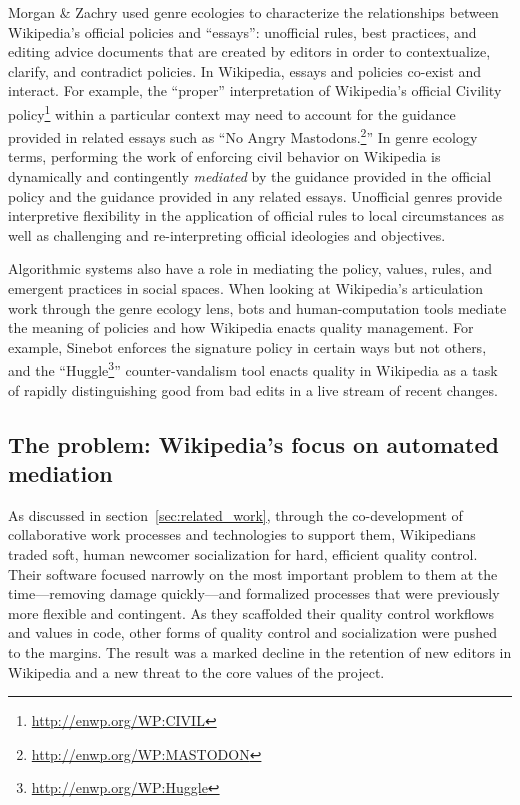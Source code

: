 Morgan \& Zachry used genre ecologies to characterize the relationships between Wikipedia's official policies and ``essays'': unofficial rules, best practices, and editing advice documents that are created by editors in order to contextualize, clarify, and contradict policies\cite{morgan2010negotiating}. In Wikipedia, essays and policies co-exist and interact. For example, the ``proper'' interpretation of Wikipedia's official Civility policy\footnote{\url{http://enwp.org/WP:CIVIL}} within a particular context may need to account for the guidance provided in related essays such as ``No Angry Mastodons.\footnote{\url{http://enwp.org/WP:MASTODON}}'' In genre ecology terms, performing the work of enforcing civil behavior on Wikipedia is dynamically and contingently \emph{mediated} by the guidance provided in the official policy and the guidance provided in any related essays. Unofficial genres provide interpretive flexibility in the application of official rules to local circumstances as well as challenging and re-interpreting official ideologies and objectives.

Algorithmic systems also have a role in mediating the policy, values, rules, and emergent practices in social spaces\cite{lessig1999code,suchman2007human,orlikowski2015algorithm}.  When looking at Wikipedia's articulation work through the genre ecology lens, bots and human-computation tools mediate the meaning of policies and how Wikipedia enacts quality management. For example, Sinebot enforces the signature policy in certain ways but not others\cite{geiger2011lives}, and the ``Huggle\footnote{\url{http://enwp.org/WP:Huggle}}'' counter-vandalism tool enacts quality in Wikipedia as a task of rapidly distinguishing good from bad edits in a live stream of recent changes\cite{halfaker2014snuggle}.

\subsection{The problem: Wikipedia's focus on automated mediation}
As discussed in section~\ref{sec:related_work}, through the co-development of collaborative work processes and technologies to support them, Wikipedians traded soft, human newcomer socialization for hard, efficient quality control. Their software focused narrowly on the most important problem to them at the time---removing damage quickly---and formalized processes that were previously more flexible and contingent. As they scaffolded their quality control workflows and values in code, other forms of quality control and socialization were pushed to the margins.  The result was a marked decline in the retention of new editors in Wikipedia and a new threat to the core values of the project.

